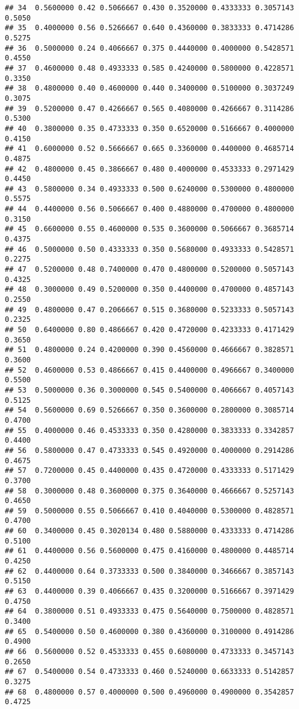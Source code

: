 \documentclass[
]{article}
\begin{document}
\begin{verbatim}
## 34  0.5600000 0.42 0.5066667 0.430 0.3520000 0.4333333 0.3057143 0.5050
## 35  0.4000000 0.56 0.5266667 0.640 0.4360000 0.3833333 0.4714286 0.5275
## 36  0.5000000 0.24 0.4066667 0.375 0.4440000 0.4000000 0.5428571 0.4550
## 37  0.4600000 0.48 0.4933333 0.585 0.4240000 0.5800000 0.4228571 0.3350
## 38  0.4800000 0.40 0.4600000 0.440 0.3400000 0.5100000 0.3037249 0.3075
## 39  0.5200000 0.47 0.4266667 0.565 0.4080000 0.4266667 0.3114286 0.5300
## 40  0.3800000 0.35 0.4733333 0.350 0.6520000 0.5166667 0.4000000 0.4150
## 41  0.6000000 0.52 0.5666667 0.665 0.3360000 0.4400000 0.4685714 0.4875
## 42  0.4800000 0.45 0.3866667 0.480 0.4000000 0.4533333 0.2971429 0.4450
## 43  0.5800000 0.34 0.4933333 0.500 0.6240000 0.5300000 0.4800000 0.5575
## 44  0.4400000 0.56 0.5066667 0.400 0.4880000 0.4700000 0.4800000 0.3150
## 45  0.6600000 0.55 0.4600000 0.535 0.3600000 0.5066667 0.3685714 0.4375
## 46  0.5000000 0.50 0.4333333 0.350 0.5680000 0.4933333 0.5428571 0.2275
## 47  0.5200000 0.48 0.7400000 0.470 0.4800000 0.5200000 0.5057143 0.4325
## 48  0.3000000 0.49 0.5200000 0.350 0.4400000 0.4700000 0.4857143 0.2550
## 49  0.4800000 0.47 0.2066667 0.515 0.3680000 0.5233333 0.5057143 0.2325
## 50  0.6400000 0.80 0.4866667 0.420 0.4720000 0.4233333 0.4171429 0.3650
## 51  0.4800000 0.24 0.4200000 0.390 0.4560000 0.4666667 0.3828571 0.3600
## 52  0.4600000 0.53 0.4866667 0.415 0.4400000 0.4966667 0.3400000 0.5500
## 53  0.5000000 0.36 0.3000000 0.545 0.5400000 0.4066667 0.4057143 0.5125
## 54  0.5600000 0.69 0.5266667 0.350 0.3600000 0.2800000 0.3085714 0.4700
## 55  0.4000000 0.46 0.4533333 0.350 0.4280000 0.3833333 0.3342857 0.4400
## 56  0.5800000 0.47 0.4733333 0.545 0.4920000 0.4000000 0.2914286 0.4675
## 57  0.7200000 0.45 0.4400000 0.435 0.4720000 0.4333333 0.5171429 0.3700
## 58  0.3000000 0.48 0.3600000 0.375 0.3640000 0.4666667 0.5257143 0.4650
## 59  0.5000000 0.55 0.5066667 0.410 0.4040000 0.5300000 0.4828571 0.4700
## 60  0.3400000 0.45 0.3020134 0.480 0.5880000 0.4333333 0.4714286 0.5100
## 61  0.4400000 0.56 0.5600000 0.475 0.4160000 0.4800000 0.4485714 0.4250
## 62  0.4400000 0.64 0.3733333 0.500 0.3840000 0.3466667 0.3857143 0.5150
## 63  0.4400000 0.39 0.4066667 0.435 0.3200000 0.5166667 0.3971429 0.4750
## 64  0.3800000 0.51 0.4933333 0.475 0.5640000 0.7500000 0.4828571 0.3400
## 65  0.5400000 0.50 0.4600000 0.380 0.4360000 0.3100000 0.4914286 0.4900
## 66  0.5600000 0.52 0.4533333 0.455 0.6080000 0.4733333 0.3457143 0.2650
## 67  0.5400000 0.54 0.4733333 0.460 0.5240000 0.6633333 0.5142857 0.3275
## 68  0.4800000 0.57 0.4000000 0.500 0.4960000 0.4900000 0.3542857 0.4725

\end{verbatim}
\end{document}
